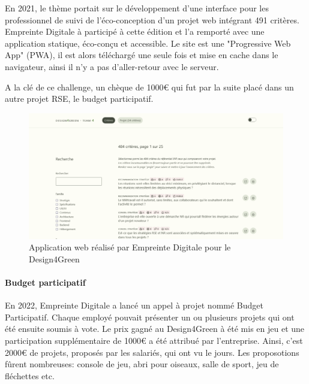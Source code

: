 \documentclass[12pt]{article}
\begin{document}
En 2021, le thème portait sur le développement d'une interface pour les professionnel de suivi de l'éco-conception d'un projet web intégrant 491 critères.
Empreinte Digitale à participé à cette édition et l'a remporté avec une application statique, éco-conçu et accessible.
Le site est une "Progressive Web App" (\gls{PWA}), il est alors téléchargé une seule fois et mise en cache dans le navigateur, ainsi il n'y a pas d'aller-retour avec le serveur.

A la clé de ce challenge, un chèque de 1000€ qui fut par la suite placé dans un autre projet \gls{RSE}, le budget participatif.

\begin{figure}[!ht]
    \centering
    \includegraphics[width=\textwidth]{src/design4fgreen.png}
    \caption{Application web réalisé par Empreinte Digitale pour le Design4Green}
    \label{fig:design4greenl}
\end{figure}

\paragraph{Budget participatif}
En 2022, Empreinte Digitale a lancé un appel à projet nommé Budget Participatif. 
Chaque employé pouvait présenter un ou plusieurs projets qui ont été ensuite soumis à vote. 
Le prix gagné au Design4Green à été mis en jeu et une participation supplémentaire de 1000€ a été attribué par l'entreprise. 
Ainsi, c'est 2000€ de projets, proposés par les salariés, qui ont vu le jours. 
Les proposotions fûrent nombreuses: console de jeu, abri pour oiseaux, salle de sport, jeu de fléchettes etc.
\end{document}
